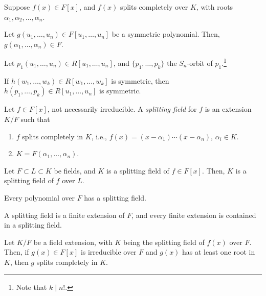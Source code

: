 \begin{cor}\label{l37:cor9}
	Suppose $f(x) \in F[x]$, and $f(x)$ splits completely over $K$, with roots $\alpha_1, \alpha_2, \dots, \alpha_n$.

	Let $g(u_1, \dots, u_n) \in F[u_1, \dots, u_n]$ be a symmetric polynomial. Then, $g(\alpha_1, \dots, \alpha_n) \in F$.
\end{cor}

\begin{cor}\label{l37:cor10}
	Let $p_1(u_1, \dots, u_n) \in R[u_1, \dots, u_n]$, and $\{p_1, \dots, p_k\}$ the  $S_n$-orbit of $p_1$.\footnote{Note that $k \mid n!$.}

	If $h(w_1, \dots, w_k) \in R[w_1, \dots, w_k]$ is symmetric, then $h(p_1, \dots, p_k) \in R[u_1, \dots, u_n]$ is symmetric.
\end{cor}

\begin{defn}
	Let $f \in F[x]$, not necessarily irreducible. A \emph{splitting field} for $f$ is an extension $K / F$ such that
	\begin{enumerate}
		\item $f$ splits completely in $K$, i.e., $f(x) = (x - \alpha_1)\cdots(x - \alpha_n)$, $\alpha_i \in K$. 
		\item $K = F(\alpha_1, \dots, \alpha_n)$.
	\end{enumerate}
\end{defn}

\begin{lem}
	Let $F \subset L \subset K$ be fields, and $K$ is a splitting field of $f \in F[x]$. Then,  $K$ is a splitting field of $f$ over $L$.
\end{lem}

\begin{lem}
	Every polynomial over $F$ has a splitting field.
\end{lem}

\begin{lem}
	A splitting field is a finite extension of $F$, and every finite extension is contained in a splitting field.
\end{lem}

\begin{thm}
	Let $K/F$ be a field extension, with  $K$ being the splitting field of $f(x)$ over $F$. Then, if $g(x) \in F[x]$ is irreducible over $F$ and  $g(x)$ has at least one root in $K$, then $g$ splits completely in $K$.
\end{thm}

